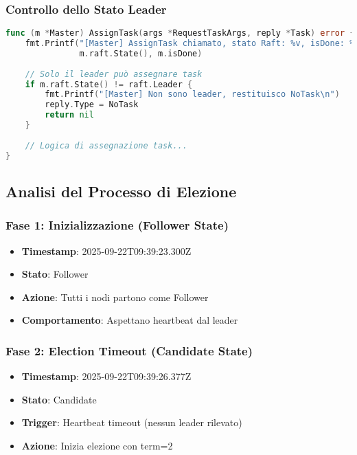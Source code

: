 \documentclass[12pt,a4paper]{article}
\begin{document}
\subsubsection{Controllo dello Stato Leader}

\begin{lstlisting}[language=go]
func (m *Master) AssignTask(args *RequestTaskArgs, reply *Task) error {
    fmt.Printf("[Master] AssignTask chiamato, stato Raft: %v, isDone: %v\n", 
               m.raft.State(), m.isDone)
    
    // Solo il leader può assegnare task
    if m.raft.State() != raft.Leader {
        fmt.Printf("[Master] Non sono leader, restituisco NoTask\n")
        reply.Type = NoTask
        return nil
    }
    
    // Logica di assegnazione task...
}
\end{lstlisting}

\subsection{Analisi del Processo di Elezione}

\subsubsection{Fase 1: Inizializzazione (Follower State)}

\begin{itemize}
\item \textbf{Timestamp}: 2025-09-22T09:39:23.300Z
\item \textbf{Stato}: Follower
\item \textbf{Azione}: Tutti i nodi partono come Follower
\item \textbf{Comportamento}: Aspettano heartbeat dal leader
\end{itemize}

\subsubsection{Fase 2: Election Timeout (Candidate State)}

\begin{itemize}
\item \textbf{Timestamp}: 2025-09-22T09:39:26.377Z
\item \textbf{Stato}: Candidate
\item \textbf{Trigger}: Heartbeat timeout (nessun leader rilevato)
\item \textbf{Azione}: Inizia elezione con term=2
\end{itemize}
\end{document}
